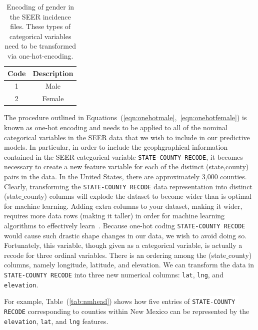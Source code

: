 \documentclass[10pt,letterpaper]{article}
\newcommand{\codewhite}[1]{\colorbox{white}{\texttt{#1}}}
\begin{document}
\begin{table}[tbp]
\begin{center}
\begin{tabular}{cc}
\toprule
Code & Description \\ 
\midrule
1 & Male \\  
2 & Female \\  
\bottomrule
\end{tabular}
\caption{\label{tab:sex} Encoding of gender in the SEER incidence files. These types of categorical variables need to be transformed via one-hot-encoding.}
\end{center}
\end{table}

The procedure outlined in Equations~(\ref{eqn:onehotmale},~\ref{eqn:onehotfemale}) is known as one-hot encoding 
and needs to be applied to all of the nominal categorical variables in the SEER data that we wish to include in our predictive models.
In particular, in order to include the geophgraphical information contained in the SEER categorical variable \codewhite{STATE-COUNTY RECODE}, it becomes necessary to create a new feature variable for each of the distinct (state,county) pairs in the data. In the United States, there are approximately 3,000 counties. Clearly, transforming the \codewhite{STATE-COUNTY RECODE} data representation into distinct (state$\_$county) columns will explode the dataset to become wider than is optimal for machine learning. Adding extra columns to your dataset, making it wider, requires more data rows (making it taller) in order for machine learning algorithms to effectively learn~\cite{bowles}. Because one-hot coding \codewhite{STATE-COUNTY RECODE} would cause such drastic shape changes in our data, we wish to avoid doing so. Fortunately, this variable, though given as a categorical variable, is actually a recode for three ordinal variables. There is an ordering among the (state$\_$county) columns, namely longitude, latitude, and elevation. We can transform the data in \codewhite{STATE-COUNTY RECODE} into three new numerical columns: \codewhite{lat}, \codewhite{lng}, and \codewhite{elevation}.

For example, Table~(\ref{tab:nmhead}) shows how five entries of \codewhite{STATE-COUNTY RECODE} corresponding to counties within New Mexico can be represented by the 
\codewhite{elevation}, \codewhite{lat}, and \codewhite{lng} features.
\end{document}
